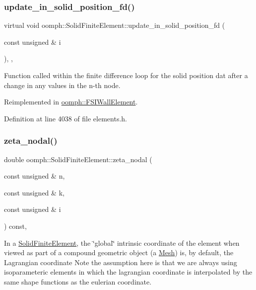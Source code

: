 \subsubsection{\texorpdfstring{update\+\_\+in\+\_\+solid\+\_\+position\+\_\+fd()}{update\_in\_solid\_position\_fd()}}
{\footnotesize\ttfamily virtual void oomph\+::\+Solid\+Finite\+Element\+::update\+\_\+in\+\_\+solid\+\_\+position\+\_\+fd (\begin{DoxyParamCaption}\item[{const unsigned \&}]{i }\end{DoxyParamCaption})\hspace{0.3cm}{\ttfamily [inline]}, {\ttfamily [protected]}, {\ttfamily [virtual]}}



Function called within the finite difference loop for the solid position dat after a change in any values in the n-\/th node. 



Reimplemented in \hyperlink{classoomph_1_1FSIWallElement_ae05300394e531c7b80dc44d1f5e1dbfe}{oomph\+::\+F\+S\+I\+Wall\+Element}.



Definition at line 4038 of file elements.\+h.

\mbox{\label{classoomph_1_1SolidFiniteElement_a4a377d7acaa7fbe444a65ed3d4a79bed}} 
\subsubsection{\texorpdfstring{zeta\+\_\+nodal()}{zeta\_nodal()}}
{\footnotesize\ttfamily double oomph\+::\+Solid\+Finite\+Element\+::zeta\+\_\+nodal (\begin{DoxyParamCaption}\item[{const unsigned \&}]{n,  }\item[{const unsigned \&}]{k,  }\item[{const unsigned \&}]{i }\end{DoxyParamCaption}) const\hspace{0.3cm}{\ttfamily [inline]}, {\ttfamily [virtual]}}



In a \hyperlink{classoomph_1_1SolidFiniteElement}{Solid\+Finite\+Element}, the \char`\"{}global\char`\"{} intrinsic coordinate of the element when viewed as part of a compound geometric object (a \hyperlink{classoomph_1_1Mesh}{Mesh}) is, by default, the Lagrangian coordinate Note the assumption here is that we are always using isoparameteric elements in which the lagrangian coordinate is interpolated by the same shape functions as the eulerian coordinate. 




